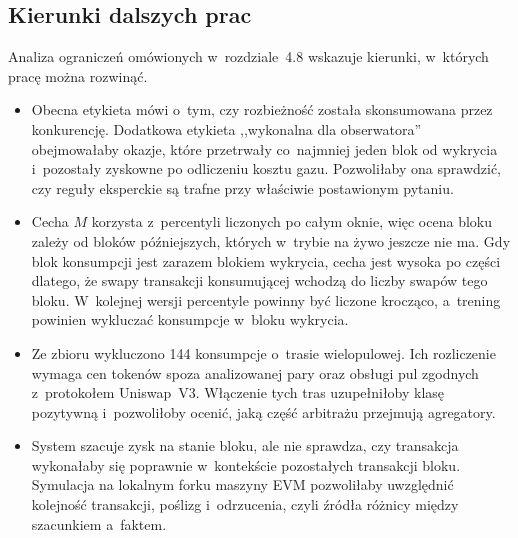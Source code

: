 \subsection{Kierunki dalszych prac}
Analiza ograniczeń omówionych w~rozdziale~4.8 wskazuje kierunki, w~których pracę można rozwinąć.
\begin{itemize}[nosep]
  \item Obecna etykieta mówi o~tym, czy rozbieżność została skonsumowana przez konkurencję.
        Dodatkowa etykieta ,,wykonalna dla obserwatora'' obejmowałaby okazje, które przetrwały
        co~najmniej jeden blok od wykrycia i~pozostały zyskowne po odliczeniu kosztu gazu.
        Pozwoliłaby ona sprawdzić, czy reguły eksperckie są trafne przy właściwie postawionym
        pytaniu.
  \item Cecha $M$ korzysta z~percentyli liczonych po całym oknie, więc ocena bloku zależy od
        bloków późniejszych, których w~trybie na żywo jeszcze nie ma. Gdy blok konsumpcji jest
        zarazem blokiem wykrycia, cecha jest wysoka po części dlatego, że swapy transakcji
        konsumującej wchodzą do liczby swapów tego bloku. W~kolejnej wersji percentyle powinny
        być liczone krocząco, a~trening powinien wykluczać konsumpcje w~bloku wykrycia.
  \item Ze zbioru wykluczono 144 konsumpcje o~trasie wielopulowej. Ich rozliczenie wymaga cen
        tokenów spoza analizowanej pary oraz obsługi pul zgodnych z~protokołem Uniswap~V3.
        Włączenie tych tras uzupełniłoby klasę pozytywną i~pozwoliłoby ocenić, jaką część
        arbitrażu przejmują agregatory.
  \item System szacuje zysk na stanie bloku, ale nie sprawdza, czy transakcja wykonałaby się
        poprawnie w~kontekście pozostałych transakcji bloku. Symulacja na lokalnym forku maszyny
        EVM pozwoliłaby uwzględnić kolejność transakcji, poślizg i~odrzucenia, czyli źródła
        różnicy między szacunkiem a~faktem.
\end{itemize}
